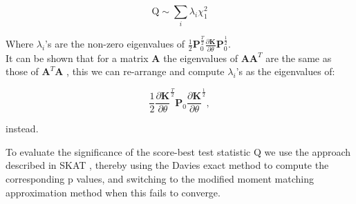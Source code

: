 \begin{equation}
    \mathrm{Q} \sim \sum_i \lambda_i \chi^2_1 
\end{equation}

Where $\lambda_i$'s are the non-zero eigenvalues of $\frac{1}{2}\mathbf{P}_0^{\frac{T}{2}} \frac{\partial\mathbf{K}}{\partial \theta} \mathbf{P}_0^{\frac{1}{2}}$.\\

It can be shown that for a matrix $\mathbf{A}$ the eigenvalues of $\mathbf{A}\mathbf{A}^T$ are the same as those of $\mathbf{A}^T\mathbf{A}$ , this we can re-arrange and compute $\lambda_i$'s as the eigenvalues of:

\begin{equation}
    \frac{1}{2}\frac{\partial\mathbf{K}}{\partial \theta}^{\frac{T}{2}} \mathbf{P}_0 \frac{\partial\mathbf{K}}{\partial \theta}^{\frac{1}{2}},
\end{equation}

instead.

To evaluate the significance of the score-best test statistic $\mathrm{Q}$ we use the approach described in SKAT \cite{wu2011rare}, thereby using the Davies exact method \cite{davies1980algorithm} to compute the corresponding p values, and switching to the modified moment matching approximation method \cite{liu2009new, lee2012optimal, duchesne2010computing} when this fails to converge.








